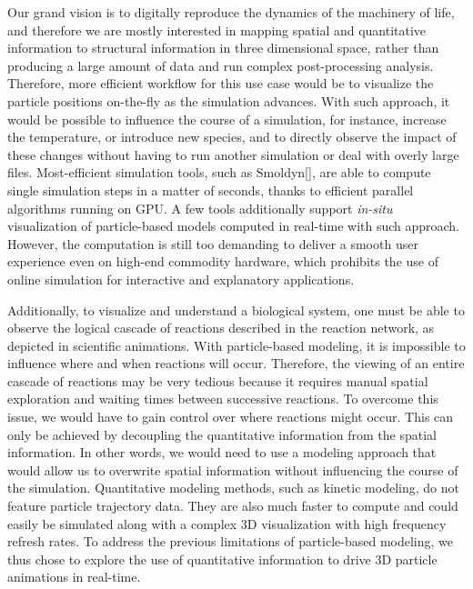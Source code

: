 Our grand vision is to digitally reproduce the dynamics of the machinery of life, and therefore we are mostly interested in mapping spatial and quantitative information to structural information in three dimensional space, rather than producing a large amount of data and run complex post-processing analysis.
Therefore, more efficient workflow for this use case would be to visualize the particle positions on-the-fly as the simulation advances.
With such approach, it would be possible to influence the course of a simulation, for instance, increase the temperature, or introduce new species, and to directly observe the impact of these changes without having to run another simulation or deal with overly large files.
Most-efficient simulation tools, such as Smoldyn[], are able to compute single simulation steps in a matter of seconds, thanks to efficient parallel algorithms running on GPU.
A few tools additionally support \textit{in-situ} visualization of particle-based models computed in real-time with such approach.
However, the computation is still too demanding to deliver a smooth user experience even on high-end commodity hardware, which prohibits the use of online simulation for interactive and explanatory applications.

Additionally, to visualize and understand a biological system, one must be able to observe the logical cascade of reactions described in the reaction network, as depicted in scientific animations.
With particle-based modeling, it is impossible to influence where and when reactions will occur.
Therefore, the viewing of an entire cascade of reactions may be very tedious because it requires manual spatial exploration and waiting times between successive reactions.
To overcome this issue, we would have to gain control over where reactions might occur.
This can only be achieved by decoupling the quantitative information from the spatial information.
In other words, we would need to use a modeling approach that would allow us to overwrite spatial information without influencing the course of the simulation.
Quantitative modeling methods, such as kinetic modeling, do not feature particle trajectory data.
They are also much faster to compute and could easily be simulated along with a complex 3D visualization with high frequency refresh rates.
To address the previous limitations of particle-based modeling, we thus chose to explore the use of quantitative information to drive 3D particle animations in real-time.

